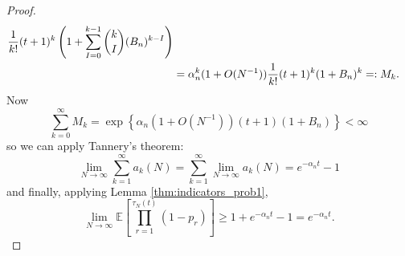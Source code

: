 \documentclass{article}
\newcommand{\Prob}{\mathbb{P}}
\newcommand{\E}{\mathbb{E}}
\newcommand{\I}[1]{\mathbbm{1}_{\{#1\}}}
\newcommand{\1}[1]{\mathbbm{1}_{#1}}
\begin{document}
\begin{proof}
\begin{align}
\frac{1}{k!} (t+1)^k \left( 1+\sum_{I=0}^{k-1} \binom{k}{I} (B_n)^{k-I} \right) \notag\\
&= \alpha_n^k (1+O(N^{-1})) \frac{1}{k!} (t+1)^k (1 + B_n)^k 
=: M_k .
\end{align}
Now
\begin{equation}
\sum_{k=0}^\infty M_k = \exp \left\{ \alpha_n (1+O(N^{-1})) (t+1) (1+B_n) \right\} < \infty
\end{equation}
so we can apply Tannery's theorem:
\begin{equation}\label{eq:26a}
\lim_{N\to\infty} \sum_{k=1}^\infty a_k(N)
= \sum_{k=1}^\infty \lim_{N\to\infty} a_k(N)
= e^{-\alpha_n t} -1
\end{equation}
and finally, applying Lemma \ref{thm:indicators_prob1},
\begin{equation}
\lim_{N\to\infty} \E \left[ \prod_{r=1}^{\tau_N(t)} (1-p_r) \right]
\geq 1 + e^{-\alpha_n t} -1 = e^{-\alpha_n t} .
\end{equation}



\end{proof}
\end{document}
